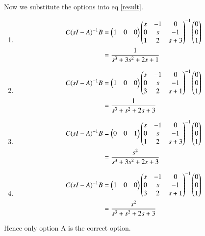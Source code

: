 \documentclass[journal,12pt,twocolumn]{IEEEtran}
\begin{document}
Now we substitute the options into eq \ref{result}.
\begin{enumerate}[label = (\Alph*)]
    \item \begin{align}
        C(sI-A)^{-1} B &= \begin{pmatrix}1 & 0 & 0\end{pmatrix}\begin{pmatrix}s & -1 & 0 \\ 0 & s & -1\\ 1 & 2 & s+3\end{pmatrix}^{-1}\begin{pmatrix}0 \\0 \\1\end{pmatrix}\\
        &= \dfrac{1}{s^3+3s^2+2s+1}
    \end{align}
    \item \begin{align}
        C(sI-A)^{-1} B &= \begin{pmatrix}1 & 0 & 0\end{pmatrix}\begin{pmatrix}s & -1 & 0 \\ 0 & s & -1\\ 3 & 2 & s+1\end{pmatrix}^{-1}\begin{pmatrix}0 \\0 \\1\end{pmatrix}\\
        &= \dfrac{1}{s^3+s^2+2s+3}
    \end{align}
    \item \begin{align}
        C(sI-A)^{-1} B &= \begin{pmatrix}0 & 0 & 1\end{pmatrix}\begin{pmatrix}s & -1 & 0 \\ 0 & s & -1\\ 1 & 2 & s+3\end{pmatrix}^{-1}\begin{pmatrix}0 \\0 \\1\end{pmatrix}\\
        &= \dfrac{s^2}{s^3+3s^2+2s+3}
    \end{align}
    \item \begin{align}
        C(sI-A)^{-1} B &= \begin{pmatrix}1 & 0 & 0\end{pmatrix}\begin{pmatrix}s & -1 & 0 \\ 0 & s & -1\\ 3 & 2 & s+1\end{pmatrix}^{-1}\begin{pmatrix}0 \\0 \\1\end{pmatrix}\\
        &= \dfrac{s^2}{s^3+s^2+2s+3}
    \end{align}
\end{enumerate}

Hence only option A is the correct option.
\end{document}
